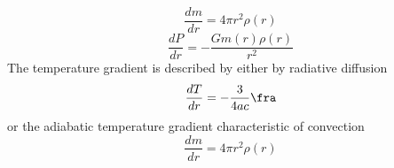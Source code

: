 \begin{equation}
    \frac{dm}{dr} = 4\pi r^2 \rho(r)
\end{equation}
\begin{equation}
    \frac{dP}{dr} = -\frac{G m(r)\rho(r)}{r^2}
\end{equation}
The temperature gradient is described by either by radiative diffusion
\begin{equation}
    \frac{dT}{dr} = -\frac{3}{4ac}\fra
\end{equation}
or the adiabatic temperature gradient characteristic of convection
\begin{equation}
    \frac{dm}{dr} = 4\pi r^2 \rho(r)
\end{equation}